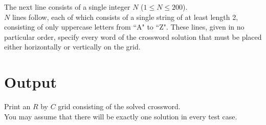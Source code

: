 \noindent The next line consists of a single integer $N$ ($1 \leq N \leq 200$).\\

\noindent $N$ lines follow, each of which consists of a single string of at least length 2, consisting of only uppercase letters from ``A" to ``Z". These lines, given in no particular order, specify every word of the crossword solution that must be placed either horizontally or vertically on the grid.

\section*{Output}

\noindent Print an $R$ by $C$ grid consisting of the solved crossword.\\
You may assume that there will be exactly one solution in every test case.
